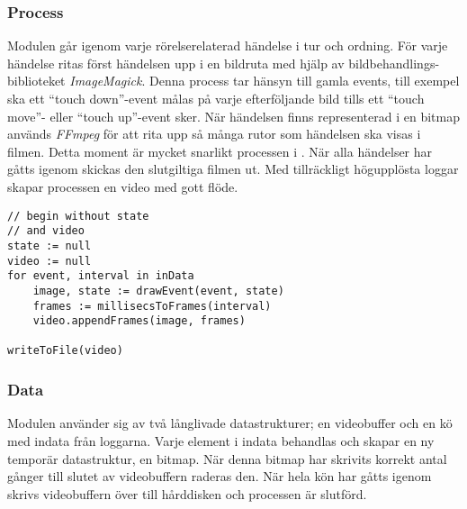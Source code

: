 \subsubsection{Process}
Modulen går igenom varje rörelserelaterad händelse i tur och ordning. För varje händelse ritas först händelsen upp i en bildruta med hjälp av bildbehandlings-biblioteket \textit{ImageMagick}. Denna process tar hänsyn till gamla events, till exempel ska ett ``touch down''-event målas på varje efterföljande bild tills ett ``touch move''- eller ``touch up''-event sker. När händelsen finns representerad i en bitmap används \textit{FFmpeg} för att rita upp så många rutor som händelsen ska visas i filmen. Detta moment är mycket snarlikt processen i . När alla händelser har gåtts igenom skickas den slutgiltiga filmen ut. Med tillräckligt högupplösta loggar skapar processen en video med gott flöde.

\begin{verbatim}
// begin without state
// and video
state := null
video := null
for event, interval in inData
    image, state := drawEvent(event, state) 
    frames := millisecsToFrames(interval)
    video.appendFrames(image, frames)

writeToFile(video)
\end{verbatim}

\subsubsection{Data}
Modulen använder sig av två långlivade datastrukturer; en videobuffer och en kö med indata från loggarna. Varje element i indata behandlas och skapar en ny temporär datastruktur, en bitmap. När denna bitmap har skrivits korrekt antal gånger till slutet av videobuffern raderas den. När hela kön har gåtts igenom skrivs videobuffern över till hårddisken och processen är slutförd.
